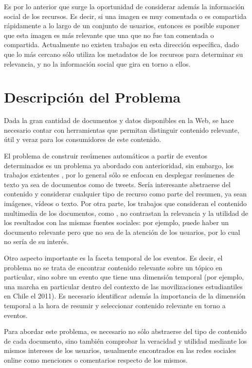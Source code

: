 \documentclass[11pt,letterpaper]{article}
\begin{document}
   Es por lo anterior que surge la oportunidad de considerar además la
   información social de los recursos. Es decir, si una imagen es muy
   comentada o es compartida rápidamente a lo largo de un conjunto de
   usuarios, entonces es posible suponer que esta imagen es más
   relevante que una que no fue tan comentada o compartida. Actualmente
   no existen trabajos en esta dirección específica, dado que lo más
   cercano sólo utiliza los metadatos de los recursos para determinar
   su relevancia, y no la información social que gira en torno a ellos.

\pagebreak
\section{Descripción del Problema}
\label{sec-2}

  Dada la gran cantidad de documentos y datos disponibles en la Web,
  se hace necesario contar con herramientas que permitan distinguir
  contenido relevante, útil y veraz para los consumidores de este
  contenido.

  El problema de construir resúmenes automáticos a partir de eventos
  determinados es un problema ya abordado con anterioridad, sin
  embargo, los trabajos existentes \cite{events, clusterers, real},
  por lo general sólo se enfocan en desplegar resúmenes de texto ya
  sea de documentos como de tweets. Sería interesante abstraerse del
  contenido y considerar cualquier tipo de recurso como parte del
  resumen, ya sean imágenes, vídeos o texto. Por otra parte, los
  trabajos que consideran el contenido multimedia de los documentos,
  como \cite{concerts}, no contrastan la relevancia y la utilidad de
  los resultados con las mismas fuentes sociales: por ejemplo, puede
  haber un documento relevante pero que no sea de la atención de los
  usuarios, por lo cual no sería de su interés.

  Otro aspecto importante es la faceta temporal de los eventos.  Es
  decir, el problema no se trata de encontrar contenido relevante
  sobre un tópico en particular, sino sobre un evento que tiene una
  dimensión temporal (por ejemplo, una marcha en particular dentro del
  contexto de las movilizaciones estudiantiles en Chile el 2011). Es
  necesario identificar además la importancia de la dimensión temporal
  a la hora de resumir y seleccionar contenido relevante en torno a
  eventos.

  Para abordar este problema, es necesario no sólo abstraerse del tipo
  de contenido de cada documento, sino también comprobar la veracidad
  y utilidad mediante los mismos intereses de los usuarios, usualmente
  encontrados en las redes sociales online como menciones o
  comentarios respecto de los mismos.
\end{document}

